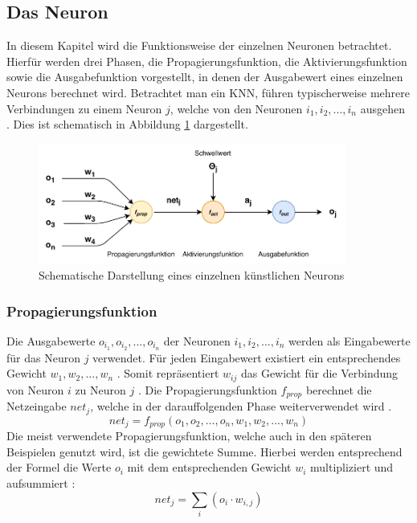 \subsection{Das Neuron}
\label{subsec:neuron}
In diesem Kapitel wird die Funktionsweise der einzelnen Neuronen betrachtet. Hierfür werden drei Phasen, die Propagierungsfunktion, die Aktivierungsfunktion sowie die Ausgabefunktion vorgestellt, in denen der Ausgabewert eines einzelnen Neurons berechnet wird. Betrachtet man ein \ac{KNN}, führen typischerweise mehrere Verbindungen zu einem Neuron $j$, welche von den Neuronen $i_1, i_2, ..., i_n$ ausgehen \cite{kriesel2008kleiner}. Dies ist schematisch in Abbildung \ref{fig:neuron_overview} dargestellt.
\begin{figure}[h]
	\centering
	\includegraphics[width=0.9\textwidth]{./img/neural_network_basics/neuron_overview.pdf} 
	\caption{Schematische Darstellung eines einzelnen künstlichen Neurons}
	\label{fig:neuron_overview}
\end{figure}

\subsubsection{Propagierungsfunktion} 
Die Ausgabewerte $o_{i_1}, o_{i_2}, ..., o_{i_n}$ der Neuronen $i_1, i_2, ..., i_n$ werden als Eingabewerte für das Neuron $j$ verwendet. Für jeden Eingabewert existiert ein entsprechendes Gewicht $w_1, w_2, ..., w_n$ \cite{kriesel2008kleiner}. Somit repräsentiert $w_{ij}$ das Gewicht für die Verbindung von Neuron $i$ zu Neuron $j$ \cite{zell2003simulation}. Die Propagierungsfunktion $f_{prop}$ berechnet die Netzeingabe $net_j$, welche in der darauffolgenden Phase weiterverwendet wird \cite{kriesel2008kleiner}. 
$$net_j=f_{prop}(o_1, o_2, ..., o_n, w_1, w_2, ..., w_n)$$
Die meist verwendete Propagierungsfunktion, welche auch in den späteren Beispielen genutzt wird, ist die gewichtete Summe. Hierbei werden entsprechend der Formel die Werte $o_i$ mit dem entsprechenden Gewicht $w_i$ multipliziert und aufsummiert \cite{kriesel2008kleiner}:
$$net_j=\sum_{i}(o_{i} \cdot w_{i, j})$$

